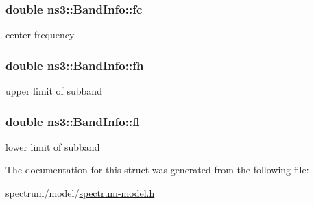 \subsubsection[{\texorpdfstring{fc}{fc}}]{\setlength{\rightskip}{0pt plus 5cm}double ns3\+::\+Band\+Info\+::fc}\hypertarget{structns3_1_1BandInfo_a02fad8a855735ff477f736bb8cb7bc25}{}\label{structns3_1_1BandInfo_a02fad8a855735ff477f736bb8cb7bc25}


center frequency 

\subsubsection[{\texorpdfstring{fh}{fh}}]{\setlength{\rightskip}{0pt plus 5cm}double ns3\+::\+Band\+Info\+::fh}\hypertarget{structns3_1_1BandInfo_a78e8fadd8cafcc28d74bda6010e3d6f4}{}\label{structns3_1_1BandInfo_a78e8fadd8cafcc28d74bda6010e3d6f4}


upper limit of subband 

\subsubsection[{\texorpdfstring{fl}{fl}}]{\setlength{\rightskip}{0pt plus 5cm}double ns3\+::\+Band\+Info\+::fl}\hypertarget{structns3_1_1BandInfo_a5e9018ae65c7625cc6d5c3c0067a9104}{}\label{structns3_1_1BandInfo_a5e9018ae65c7625cc6d5c3c0067a9104}


lower limit of subband 



The documentation for this struct was generated from the following file\+:\begin{DoxyCompactItemize}
\item 
spectrum/model/\hyperlink{spectrum-model_8h}{spectrum-\/model.\+h}\end{DoxyCompactItemize}
